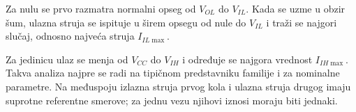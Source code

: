 Za nulu se prvo razmatra normalni opseg od $V_{OL}$ do $V_{IL}$. Kada se uzme u obzir šum, ulazna struja se ispituje u širem opsegu od nule do $V_{IL}$ i traži se najgori slučaj, odnosno najveća struja $I_{IL\max}$.

Za jedinicu ulaz se menja od $V_{CC}$ do $V_{IH}$ i određuje se najgora vrednost $I_{IH\max}$. Takva analiza najpre se radi na tipičnom predstavniku familije i za nominalne parametre. Na međuspoju izlazna struja prvog kola i ulazna struja drugog imaju suprotne referentne smerove; za jednu vezu njihovi iznosi moraju biti jednaki.
